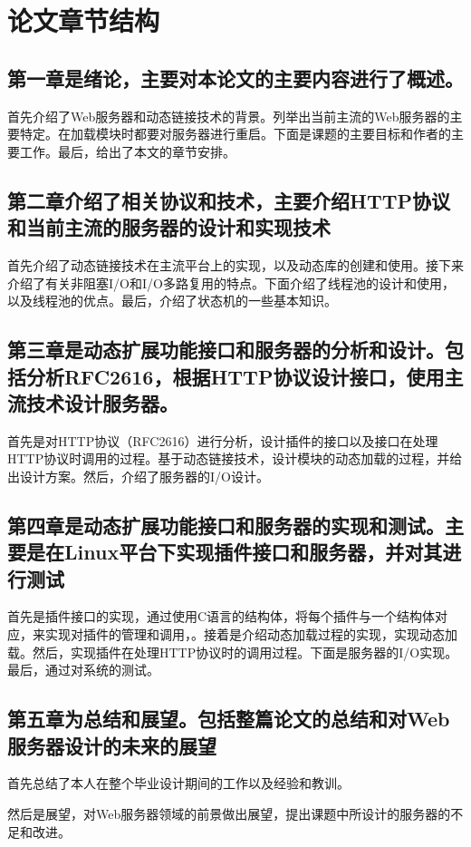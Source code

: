 \documentclass[twoside, xetex]{report}
\begin{document}
\section{论文章节结构}
	\subsection*{第一章是绪论，主要对本论文的主要内容进行了概述。}
	
	首先介绍了Web服务器和动态链接技术的背景。列举出当前主流的Web服务器的主要特定。在加载模块时都要对服务器进行重启。下面是课题的主要目标和作者的主要工作。最后，给出了本文的章节安排。
	
	\subsection*{第二章介绍了相关协议和技术，主要介绍HTTP协议和当前主流的服务器的设计和实现技术}
		首先介绍了动态链接技术在主流平台上的实现，以及动态库的创建和使用。接下来介绍了有关非阻塞I/O和I/O多路复用的特点。下面介绍了线程池的设计和使用，以及线程池的优点。最后，介绍了状态机的一些基本知识。
		
	\subsection*{第三章是动态扩展功能接口和服务器的分析和设计。包括分析RFC2616，根据HTTP协议设计接口，使用主流技术设计服务器。}
		首先是对HTTP协议（RFC2616）进行分析，设计插件的接口以及接口在处理HTTP协议时调用的过程。基于动态链接技术，设计模块的动态加载的过程，并给出设计方案。然后，介绍了服务器的I/O设计。
	
	\subsection*{第四章是动态扩展功能接口和服务器的实现和测试。主要是在Linux平台下实现插件接口和服务器，并对其进行测试}
		首先是插件接口的实现，通过使用C语言的结构体，将每个插件与一个结构体对应，来实现对插件的管理和调用，。接着是介绍动态加载过程的实现，实现动态加载。然后，实现插件在处理HTTP协议时的调用过程。下面是服务器的I/O实现。最后，通过对系统的测试。
		
	\subsection*{第五章为总结和展望。包括整篇论文的总结和对Web服务器设计的未来的展望}
		首先总结了本人在整个毕业设计期间的工作以及经验和教训。
		
		然后是展望，对Web服务器领域的前景做出展望，提出课题中所设计的服务器的不足和改进。
	
\end{document}
